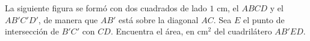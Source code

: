 La siguiente figura se formó con dos cuadrados de lado $1$ cm, el $ABCD$ y el $AB'C'D'$, de manera que $AB'$ está sobre la diagonal $AC$. Sea $E$ el punto de intersección de $B'C'$ con $CD$. Encuentra el área, en cm$^2$ del cuadrilátero $AB'ED$.